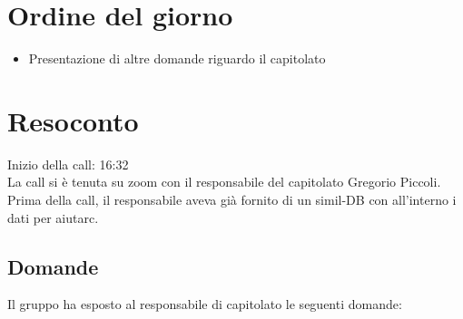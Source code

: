 \section{Ordine del giorno}

\begin{itemize}
	\item Presentazione di altre domande riguardo il capitolato
\end{itemize}

\section{Resoconto}

\noindent 
Inizio della call: 16:32 \\

\noindent La call si è tenuta su zoom con il responsabile del capitolato Gregorio Piccoli. Prima della call, il responsabile aveva già fornito di un simil-DB con all'interno i dati per aiutarc.

\subsection{Domande}

Il gruppo ha esposto al responsabile di capitolato le seguenti domande:

